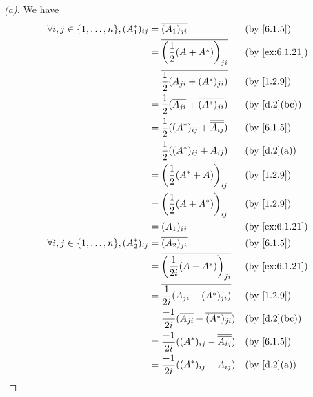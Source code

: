 \begin{proof}[(a)]
	We have
	\begin{align*}
		\forall i, j \in \set{1, \dots, n}, (A_1^*)_{i j} & = \conj{(A_1)_{j i}}                                  &  & \by{6.1.5}     \\
		                                                  & = \conj{\pa{\frac{1}{2} (A + A^*)}_{j i}}             &  & \by{ex:6.1.21} \\
		                                                  & = \conj{\frac{1}{2} (A_{j i} + (A^*)_{j i})}          &  & \by{1.2.9}     \\
		                                                  & = \frac{1}{2} (\conj{A_{j i}} + \conj{(A^*)_{j i}})   &  & \by{d.2}[bc]   \\
		                                                  & = \frac{1}{2} ((A^*)_{i j} + \conj{\conj{A_{i j}}})   &  & \by{6.1.5}     \\
		                                                  & = \frac{1}{2} ((A^*)_{i j} + A_{i j})                 &  & \by{d.2}[a]    \\
		                                                  & = \pa{\frac{1}{2} (A^* + A)}_{i j}                    &  & \by{1.2.9}     \\
		                                                  & = \pa{\frac{1}{2} (A + A^*)}_{i j}                    &  & \by{1.2.9}     \\
		                                                  & = (A_1)_{i j}                                         &  & \by{ex:6.1.21} \\
		\forall i, j \in \set{1, \dots, n}, (A_2^*)_{i j} & = \conj{(A_2)_{j i}}                                  &  & \by{6.1.5}     \\
		                                                  & = \conj{\pa{\frac{1}{2i} (A - A^*)}_{j i}}            &  & \by{ex:6.1.21} \\
		                                                  & = \conj{\frac{1}{2i} (A_{j i} - (A^*)_{j i})}         &  & \by{1.2.9}     \\
		                                                  & = \frac{-1}{2i} (\conj{A_{j i}} - \conj{(A^*)_{j i}}) &  & \by{d.2}[bc]   \\
		                                                  & = \frac{-1}{2i} ((A^*)_{i j} - \conj{\conj{A_{i j}}}) &  & \by{6.1.5}     \\
		                                                  & = \frac{-1}{2i} ((A^*)_{i j} - A_{i j})               &  & \by{d.2}[a]    \\

\end{align*}
\end{proof}
